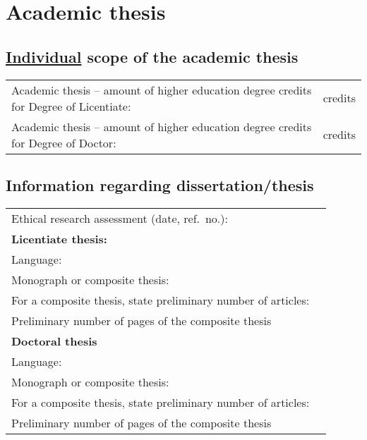 \section{Academic thesis}
\subsection{\underline{Individual} scope of the academic thesis}
\begin{tabular}{p{13cm}p{2cm}}
{\small Academic thesis -- amount of higher education degree credits for Degree of Licentiate:}
&\cellcolor[gray]{0.95}          \hfill \small credits\\
{\small Academic thesis -- amount of higher education degree credits for Degree of Doctor:}
&\cellcolor[gray]{0.95}          \hfill \small credits\\
\end{tabular}

\subsection{Information regarding dissertation/thesis}
\begin{tabular}{p{11cm}p{4cm}}
Ethical research assessment (date, ref.\ no.):                &\cellcolor[gray]{0.95}          \\
\bf Licentiate thesis: & \\
Language:                                                     &\cellcolor[gray]{0.95}     	   \\
Monograph or composite thesis:                                &\cellcolor[gray]{0.95}    	   \\
For a composite thesis, state preliminary number of articles: &\cellcolor[gray]{0.95} 		   \\
Preliminary number of pages of the composite thesis           &\cellcolor[gray]{0.95}          \\
\bf Doctoral thesis & \\
Language:                                                     &\cellcolor[gray]{0.95}      	   \\
Monograph or composite thesis:                                &\cellcolor[gray]{0.95}  		   \\
For a composite thesis, state preliminary number of articles: &\cellcolor[gray]{0.95}          \\
Preliminary number of pages of the composite thesis           &\cellcolor[gray]{0.95} 		   \\
\end{tabular}

